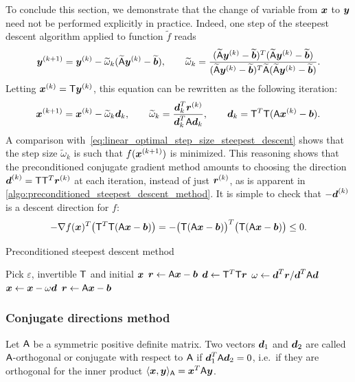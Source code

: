 To conclude this section,
we demonstrate that the change of variable from $\mathbf{\boldsymbol{x}}$ to $\mathbf{\boldsymbol{y}}$ need not be performed explicitly in practice.
Indeed, one step of the steepest descent algorithm applied to function $\widetilde f$ reads
\[
    \mathbf{\boldsymbol{y}}^{(k+1)} = \mathbf{\boldsymbol{y}}^{(k)} - \widetilde \omega_k (\widetilde {\mathsf A} \mathbf{\boldsymbol{y}}^{(k)} - \widetilde{\mathbf{\boldsymbol{b}}}),
    \qquad \widetilde \omega_k = \frac{(\widetilde {\mathsf A} \mathbf{\boldsymbol{y}}^{(k)} - \widetilde {\mathbf{\boldsymbol{b}}})^T(\widetilde {\mathsf A} \mathbf{\boldsymbol{y}}^{(k)} - \widetilde {\mathbf{\boldsymbol{b}}})}{(\widetilde {\mathsf A} \mathbf{\boldsymbol{y}}^{(k)} - \widetilde {\mathbf{\boldsymbol{b}}})^T \widetilde{\mathsf A} (\widetilde {\mathsf A} \mathbf{\boldsymbol{y}}^{(k)} - \widetilde {\mathbf{\boldsymbol{b}}})}.
\]
Letting $\mathbf{\boldsymbol{x}}^{(k)} = \mathsf T \mathbf{\boldsymbol{y}}^{(k)}$,
this equation can be rewritten as the following iteration:
\[
    \mathbf{\boldsymbol{x}}^{(k+1)} = \mathbf{\boldsymbol{x}}^{(k)} - \widetilde \omega_k \mathbf{\boldsymbol{d}}_k,
    \qquad \widetilde \omega_k = \frac{\mathbf{\boldsymbol{d}}_k^T \mathbf{\boldsymbol{r}}^{(k)}}{\mathbf{\boldsymbol{d}}_k^T \mathsf A \mathbf{\boldsymbol{d}}_k}, \qquad \mathbf{\boldsymbol{d}}_k = \mathsf T^{T} \mathsf T (\mathsf A \mathbf{\boldsymbol{x}}^{(k)} - \mathbf{\boldsymbol{b}}).
\]
A comparison with~\eqref{eq:linear_optimal_step_size_steepest_descent} shows that the step size $\widetilde \omega_k$ is such that $f(\mathbf{\boldsymbol{x}}^{(k+1)})$ is minimized.
This reasoning shows that the preconditioned conjugate gradient method amounts to choosing the direction~$\mathbf{\boldsymbol{d}}^{(k)} = \mathsf T \mathsf T^{T} \mathbf{\boldsymbol{r}}^{(k)}$ at each iteration,
instead of just $\mathbf{\boldsymbol{r}}^{(k)}$,
as is apparent in \cref{algo:preconditioned_steepest_descent_method}.
It is simple to check that $- \mathbf{\boldsymbol{d}}^{(k)}$ is a descent direction for $f$:
\[
    -\nabla f(\mathbf{\boldsymbol{x}})^T \bigl(\mathsf T^T \mathsf T (\mathsf A \mathbf{\boldsymbol{x}} - \mathbf{\boldsymbol{b}})\bigr) =
    -\bigl(\mathsf T (\mathsf A \mathbf{\boldsymbol{x}} - \mathbf{\boldsymbol{b}})\bigr)^T \bigl(\mathsf T (\mathsf A \mathbf{\boldsymbol{x}} - \mathbf{\boldsymbol{b}})\bigr) \leq 0.
\]
\begin{algorithm}[ht]
\caption{Preconditioned steepest descent method}%
\label{algo:preconditioned_steepest_descent_method}%
\begin{algorithmic}[1]
\State Pick $\varepsilon$, invertible $\mathsf T$ and initial $\mathbf{\boldsymbol{x}}$%
\State $\mathbf{\boldsymbol{r}} \gets \mathsf A \mathbf{\boldsymbol{x}} - \mathbf{\boldsymbol{b}}$%
    \State $\mathbf{\boldsymbol{d}} \gets \mathsf T^T \mathsf T \mathbf{\boldsymbol{r}}$
    \State $\omega \gets \mathbf{\boldsymbol{d}}^T \mathbf{\boldsymbol{r}}/\mathbf{\boldsymbol{d}}^T \mathsf A \mathbf{\boldsymbol{d}}$
    \State $\mathbf{\boldsymbol{x}} \gets \mathbf{\boldsymbol{x}} - \omega \mathbf{\boldsymbol{d}}$
    \State $\mathbf{\boldsymbol{r}} \gets \mathsf A \mathbf{\boldsymbol{x}} - \mathbf{\boldsymbol{b}}$
\EndWhile
\end{algorithmic}
\end{algorithm}
\vspace{-.5cm}

\subsubsection{Conjugate directions method}%
\label{ssub:conjugate_directions}
\begin{definition}
    Let $\mathsf A$ be a symmetric positive definite matrix.
    Two vectors $\mathbf{\boldsymbol{d}}_1$ and $\mathbf{\boldsymbol{d}}_2$ are called $\mathsf A$-orthogonal or conjugate with respect to $\mathsf A$
    if $\mathbf{\boldsymbol{d}}_1^T \mathsf A \mathbf{\boldsymbol{d}}_2 = 0$,
    i.e.\ if they are orthogonal for the inner product $\langle\mathbf{\boldsymbol{x}}, \mathbf{\boldsymbol{y}}\rangle_{\mathsf A} = \mathbf{\boldsymbol{x}}^T \mathsf A \mathbf{\boldsymbol{y}}$.
\end{definition}

